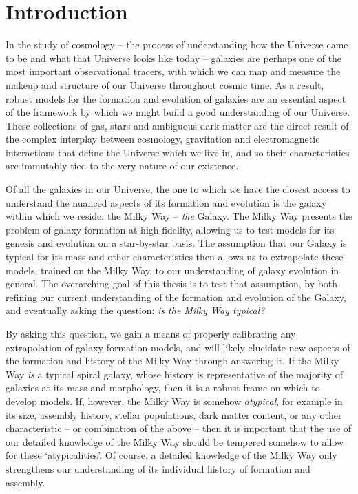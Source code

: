 \chapter{Introduction}
\label{chapter:intro}
In the study of cosmology -- the process of understanding how the Universe came to be and what that Universe looks like today -- galaxies are perhaps one of the most important observational tracers, with which we can map and measure the makeup and structure of our Universe throughout cosmic time. As a result, robust models for the formation and evolution of galaxies are an essential aspect of the framework by which we might build a good understanding of our Universe. These collections of gas, stars and ambiguous dark matter are the direct result of the complex interplay between cosmology, gravitation and electromagnetic interactions that define the Universe which we live in, and so their characteristics are immutably tied to the very nature of our existence.

Of all the galaxies in our Universe, the one to which we have the closest access to understand the nuanced aspects of its formation and evolution is the galaxy within which we reside: the Milky Way -- \emph{the} Galaxy. The Milky Way presents the problem of galaxy formation at high fidelity, allowing us to test models for its genesis and evolution on a star-by-star basis. The assumption that our Galaxy is typical for its mass and other characteristics then allows us to extrapolate these models, trained on the Milky Way, to our understanding of galaxy evolution in general. The overarching goal of this thesis is to test that assumption, by both refining our current understanding of the formation and evolution of the Galaxy, and eventually asking the question: \emph{is the Milky Way typical?}

By asking this question, we gain a means of properly calibrating any extrapolation of galaxy formation models, and will likely elucidate new aspects of the formation and history of the Milky Way through answering it. If the Milky Way \emph{is} a typical spiral galaxy, whose history is representative of the majority of galaxies at its mass and morphology, then it is a robust frame on which to develop models. If, however, the Milky Way is somehow \emph{atypical}, for example in its size, assembly history, stellar populations, dark matter content, or any other characteristic --  or combination of the above -- then it is important that the use of our detailed knowledge of the Milky Way should be tempered somehow to allow for these `atypicalities'. Of course, a detailed knowledge of the Milky Way only strengthens our understanding of its individual history of formation and assembly.

